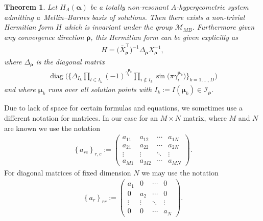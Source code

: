 \documentclass[11pt]{article}
\numberwithin{equation}{section}
\numberwithin{equation}{section}
\newtheorem{Theorem}{Theorem}[section]
\begin{document}
\begin{Theorem}\label{MB-Hermitian}
Let $H_A(\bm{\alpha})$ be a totally non-resonant $A$-hypergeometric system admitting a~Mel\-lin--Barnes basis of solutions. Then there exists a non-trivial Hermitian form $H$ which is inva\-riant under the group $\mathcal{M}_{MB}$. Furthermore given any convergence direction $\bm\rho$, this Hermitian form can be given explicitly as
\begin{gather*}
H = \big(\bar{X}_{\bm\rho}^{\intercal}\big)^{-1} \Delta_{\bm\rho} X_{\bm\rho}^{-1},%
\end{gather*}
where $\Delta_{\bm\rho}$ is the diagonal matrix
\begin{gather}
\operatorname{diag}\bigg(\bigg\{\Delta_{I_k} \prod_{l \in I_k} (-1)^{\gamma_l^{\bm\mu_k}}\prod_{i \not \in I_k} \sin\big(\pi \gamma_i^{\bm\mu_k}\big)\bigg\}_{k=1,\dots,D}\bigg)
\label{eq-deltarho}
\end{gather}
and where $\bm\mu_k$ runs over all solution points with $I_k := I(\bm{\mu}_k) \in \mathcal{I}_{\bm\rho}$.
\end{Theorem}

\begin{Note}
Due to lack of space for certain formulas and equations, we sometimes use a different notation for matrices. In our case for an $M\times N$ matrix, where $M$ and $N$ are known we use the notation \begin{gather*}
\left\{a_{rc}\right\}_{r,c} := \begin{pmatrix}a_{11} & a_{12} & \cdots & a_{1N} \\ a_{21} & a_{22} & \cdots & a_{2N} \\ \vdots & \vdots & \ddots & \vdots \\ a_{M1} & a_{M2} & \cdots & a_{MN} \end{pmatrix}\!.
\end{gather*}
For diagonal matrices of fixed dimension $N$ we may use the notation
\begin{gather*}
\left\{a_{r}\right\}_{rr} := \begin{pmatrix}a_{1} & 0 & \cdots & 0 \\ 0 & a_{2} & \cdots & 0 \\ \vdots & \vdots & \ddots & \vdots \\ 0 & 0 & \cdots & a_{N} \end{pmatrix}\!.
\end{gather*}
\end{Note}
\end{document}
